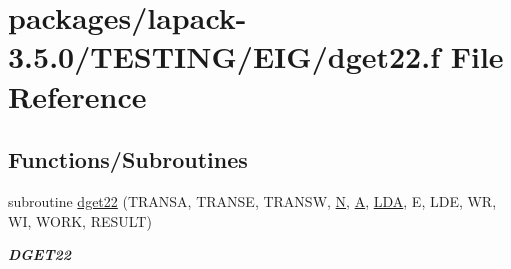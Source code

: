 \hypertarget{dget22_8f}{}\section{packages/lapack-\/3.5.0/\+T\+E\+S\+T\+I\+N\+G/\+E\+I\+G/dget22.f File Reference}
\label{dget22_8f}
\subsection*{Functions/\+Subroutines}
\begin{DoxyCompactItemize}
\item 
subroutine \hyperlink{group__double__eig_ga585a3526e86563a9452e9243c23ad31b}{dget22} (T\+R\+A\+N\+S\+A, T\+R\+A\+N\+S\+E, T\+R\+A\+N\+S\+W, \hyperlink{polmisc_8c_a0240ac851181b84ac374872dc5434ee4}{N}, \hyperlink{classA}{A}, \hyperlink{example__user_8c_ae946da542ce0db94dced19b2ecefd1aa}{L\+D\+A}, E, L\+D\+E, W\+R, W\+I, W\+O\+R\+K, R\+E\+S\+U\+L\+T)
\begin{DoxyCompactList}\small\item\em {\bfseries D\+G\+E\+T22} \end{DoxyCompactList}\end{DoxyCompactItemize}
